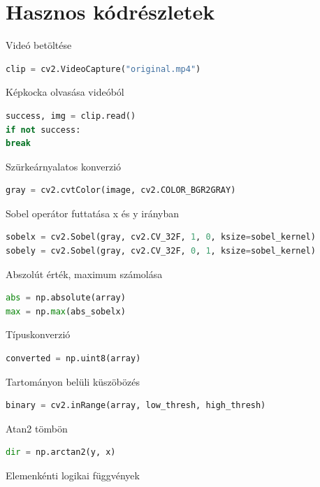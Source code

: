 \documentclass[12pt,a4paper,oneside]{report}             %
\begin{document}
\chapter{Hasznos kódrészletek}

Videó betöltése

\begin{lstlisting}[language=Python]
clip = cv2.VideoCapture("original.mp4")
\end{lstlisting}

Képkocka olvasása videóból

\begin{lstlisting}[language=Python]
success, img = clip.read()
if not success:
break
\end{lstlisting}

Szürkeárnyalatos konverzió

\begin{lstlisting}[language=Python]
gray = cv2.cvtColor(image, cv2.COLOR_BGR2GRAY)
\end{lstlisting}

Sobel operátor futtatása x és y irányban

\begin{lstlisting}[language=Python]
sobelx = cv2.Sobel(gray, cv2.CV_32F, 1, 0, ksize=sobel_kernel)
sobely = cv2.Sobel(gray, cv2.CV_32F, 0, 1, ksize=sobel_kernel)
\end{lstlisting}

Abszolút érték, maximum számolása

\begin{lstlisting}[language=Python]
abs = np.absolute(array)
max = np.max(abs_sobelx)
\end{lstlisting}

Típuskonverzió

\begin{lstlisting}[language=Python]
converted = np.uint8(array)
\end{lstlisting}

Tartományon belüli küszöbözés

\begin{lstlisting}[language=Python]
binary = cv2.inRange(array, low_thresh, high_thresh)
\end{lstlisting}

Atan2 tömbön

\begin{lstlisting}[language=Python]
dir = np.arctan2(y, x)
\end{lstlisting}

Elemenkénti logikai függvények
\end{document}
